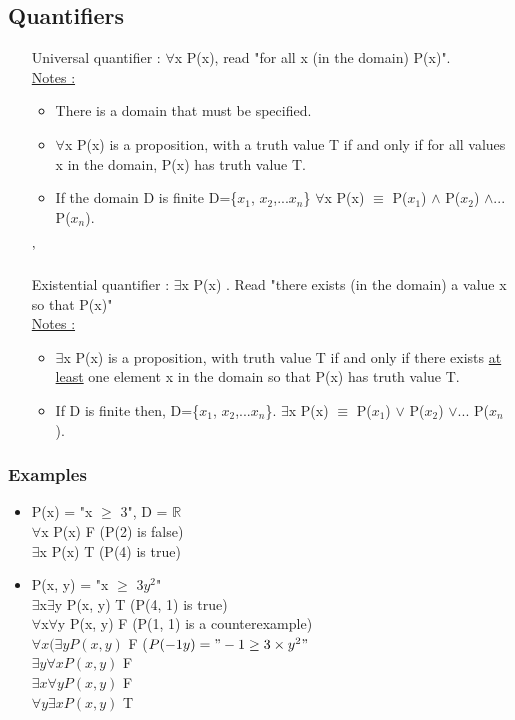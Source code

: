 \documentclass[12pt,a4paper]{article}
\begin{document}
\subsection{Quantifiers}
\begin{itemize}
	\item[Universal quantifier :] $\forall$x P(x), read "for all x (in the domain) P(x)". \\
	\underline{Notes :} 
	\begin{itemize}
		\item There is a domain that must be specified.
		\item $\forall$x P(x) is a proposition, with a truth value T if and only if for all values x in the domain, P(x) has truth value T.		
		\item If the domain D is finite D=\{$x_1$, $x_2$,...$x_n$\} $\forall$x P(x) $\equiv$ P($x_1$) $\wedge$ P($x_2$) $\wedge$... P($x_n$).
	\end{itemize} 
	
'	\item[Existential quantifier :] $\exists$x P(x) . Read "there exists (in the domain) a value x so that P(x)"\\
	\underline{Notes :}	
	\begin{itemize}
		\item $\exists$x P(x) is a proposition, with truth value T if and only if there exists \underline{at least} one element x in the domain so that P(x) has truth value T.
		\item If D is finite then, D=\{$x_1$, $x_2$,...$x_n$\}. $\exists$x P(x) $\equiv$ P($x_1$) $\vee$ P($x_2$) $\vee$... P($x_n$).
	\end{itemize}
\end{itemize}

\subsubsection{Examples}
\begin{itemize}
\item P(x) = "x $\geq$ 3", D = $\pmb{\mathbb{R}}$\\
$\forall$x P(x)  F (P(2) is false)\\
$\exists$x P(x)  T (P(4) is true)
\item P(x, y) = "x $\geq$ 3$y^2$"\\
$\exists$x$\exists$y P(x, y)  T  (P(4, 1) is true)\\
$\forall$x$\forall$y P(x, y)  F  (P(1, 1) is a counterexample)\\
$\forall x (\exists y  P(x, y)$ F  ($P(-1 y) = "-1 \geq 3\times y^2"$\\
$\exists y \forall x P(x, y)$    F\\
$\exists x \forall y P(x,y)$   F\\
$\forall y \exists x P(x, y)$  T
\end{itemize}
\end{document}
